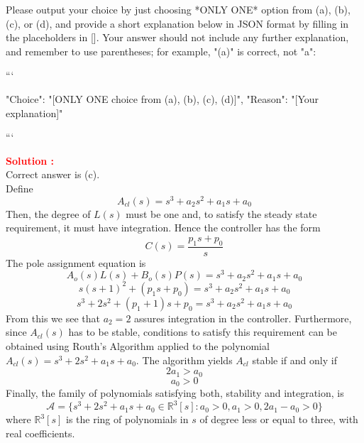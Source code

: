\documentclass[12pt]{article}
\begin{document}
Please output your choice by just choosing *ONLY ONE* option from (a), (b), (c), or (d), and provide a short explanation below in JSON format by filling in the placeholders in []. Your answer should not include any further explanation, and remember to use parentheses; for example, "(a)" is correct, not "a":

```

{
"Choice": "[ONLY ONE choice from (a), (b), (c), (d)]",
"Reason": "[Your explanation]"
}

```

\textbf{\textcolor{red}{Solution :}}\\
Correct answer is (c).\\
Define
\begin{equation}
A_{cl}(s) = s^3 + a_2s^2 + a_1s + a_0
\end{equation}
Then, the degree of $L(s)$ must be one and, to satisfy the steady state requirement, it must have integration. Hence the controller has the form
\begin{equation}
C(s) = \frac{p_1s + p_0}{s}
\end{equation}
The pole assignment equation is
\begin{equation}
A_o(s)L(s) + B_o(s)P(s) = s^3 + a_2s^2 + a_1s + a_0
\end{equation}
\begin{equation}
s(s + 1)^2 + (p_1s + p_0) = s^3 + a_2s^2 + a_1s + a_0
\end{equation}
\begin{equation}
s^3 + 2s^2 + (p_1 + 1)s + p_0 = s^3 + a_2s^2 + a_1s + a_0
\end{equation}
From this we see that $a_2 = 2$ assures integration in the controller. Furthermore, since $A_{cl}(s)$ has to be stable, conditions to satisfy this requirement can be obtained using Routh's Algorithm applied to the polynomial $A_{cl}(s) = s^3 + 2s^2 + a_1s + a_0$. The algorithm yields $A_{cl}$ stable if and only if
\begin{equation}
2a_1 > a_0
\end{equation}
\begin{equation}
a_0 > 0
\end{equation}
Finally, the family of polynomials satisfying both, stability and integration, is
\begin{equation}
\mathcal{A} = \{s^3 + 2s^2 + a_1s + a_0 \in \mathbb{R}^3[s] : a_0 > 0, a_1 > 0, 2a_1 - a_0 > 0\}
\end{equation}
where $\mathbb{R}^3[s]$ is the ring of polynomials in $s$ of degree less or equal to three, with real coefficients.
\clearpage
\end{document}
